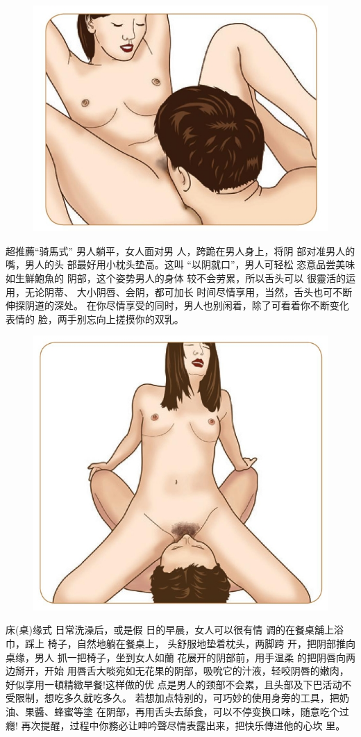 \documentclass[12pt,UTF8]{ctexbook}
\begin{document}
\begin{figure}[htbp]
	\centering
	\includegraphics[width=0.7\linewidth]{21}
	\caption{}
	\label{fig:1}
\end{figure}

超推薦“骑馬式”
男人躺平，女人面对男
人，跨跪在男人身上，将阴
部对准男人的嘴，男人的头
部最好用小枕头垫高。这叫
“以阴就口”，男人可轻松
恣意品尝美味如生鮮鮑魚的
阴部，这个姿势男人的身体
较不会劳累，所以舌头可以
很靈活的运用，无论阴蒂、
大小阴唇、会阴，都可加长
时间尽情享用，当然，舌头也可不断伸探阴道的深处。
在你尽情享受的同时，男人也别闲着，除了可看着你不断变化表情的
脸，两手别忘向上搓摸你的双乳。

\begin{figure}[htbp]
	\centering
	\includegraphics[width=0.7\linewidth]{22}
	\caption{}
	\label{fig:1}
\end{figure}

床(桌)缘式
日常洗澡后，或是假
日的早晨，女人可以很有情
调的在餐桌舖上浴巾，踩上
椅子，自然地躺在餐桌上，
头舒服地垫着枕头，两脚跨
开，把阴部推向桌缘，男人
抓一把椅子，坐到女人如蘭
花展开的阴部前，用手温柔
的把阴唇向两边掰开，开始
用唇舌大啖宛如无花果的阴部，吸吮它的汁液，轻咬阴唇的嫩肉，好似享用一頓精緻早餐!这样做的优
点是男人的颈部不会累，且头部及下巴活动不受限制，想吃多久就吃多久。
若想加点特别的，可巧妙的使用身旁的工具，把奶油、果醬、蜂蜜等塗
在阴部，再用舌头去舔食，可以不停变换口味，随意吃个过癮!
再次提醒，过程中你務必让呻吟聲尽情表露出来，把快乐傳进他的心坎
里。
\end{document}
